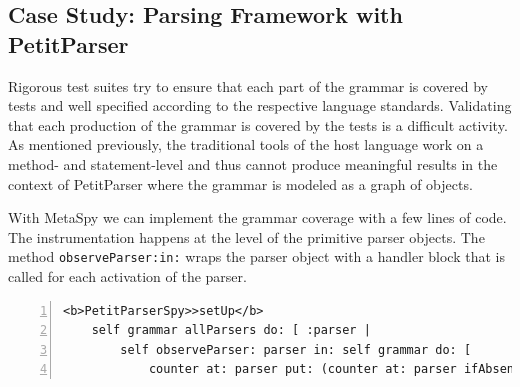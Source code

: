 \documentclass[runningheads]{llncs}
\newcommand{\project}{{\sc MetaSpy}\xspace}
\newcommand{\ct}{\lstinline[backgroundcolor=\color{white},basicstyle=\footnotesize\ttfamily]}
\newcommand{\lr}[1]{\nb{Lukas}{orange}{#1}}
\begin{document}
%

\lr{so what?}

\subsection{Case Study: Parsing Framework with PetitParser}

Rigorous test suites try to ensure that each part of the grammar is covered by tests and well specified according to the respective language standards. Validating that each production of the grammar is covered by the tests is a difficult activity. As mentioned previously, the traditional tools of the host language work on a method- and statement-level and thus cannot produce meaningful results in the context of PetitParser where the grammar is modeled as a graph of objects.

With \project we can implement the grammar coverage with a few lines of code. The instrumentation happens at the level of the primitive parser objects. The method \ct{observeParser:in:} wraps the parser object with a handler block that is called for each activation of the parser.

\begin{lstlisting}[numbers=left]
<b>PetitParserSpy>>setUp</b>
	self grammar allParsers do: [ :parser |
		self observeParser: parser in: self grammar do: [
			counter at: parser put: (counter at: parser ifAbsent: [ 0 ]) + 1 ] ]
\end{lstlisting}
\end{document}
